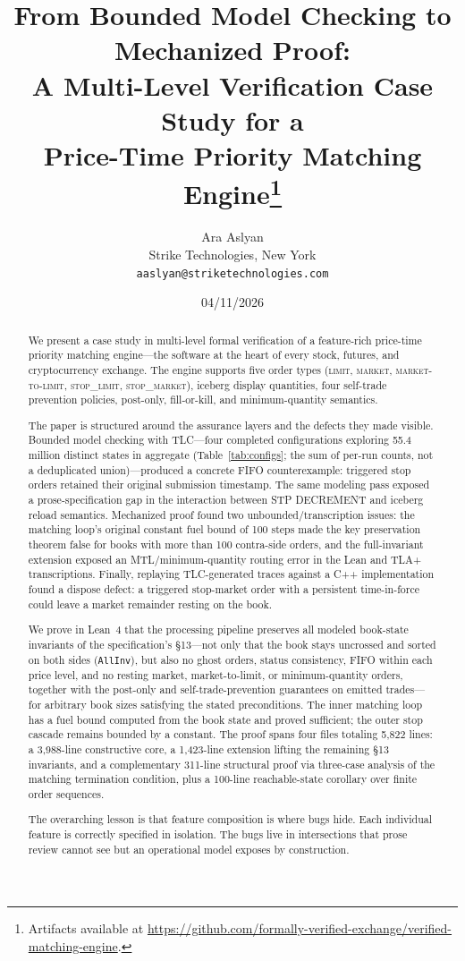 \documentclass[11pt,a4paper]{article}
\title{From Bounded Model Checking to Mechanized Proof:\\
A Multi-Level Verification Case Study for a\\
Price-Time Priority Matching Engine\thanks{Artifacts available at
\url{https://github.com/formally-verified-exchange/verified-matching-engine}.}}
\author{%
  Ara Aslyan\\
  Strike Technologies, New York\\
  \texttt{aaslyan@striketechnologies.com}
}
\date{04/11/2026}
\begin{document}
\maketitle

\begin{abstract}
We present a case study in multi-level formal verification of a
feature-rich price-time priority matching engine---the software at the
heart of every stock, futures, and cryptocurrency exchange. The engine
supports five order types (\textsc{limit}, \textsc{market},
\textsc{market-to-limit}, \textsc{stop\_limit}, \textsc{stop\_market}),
iceberg display quantities, four self-trade prevention policies,
post-only, fill-or-kill, and minimum-quantity semantics.

The paper is structured around the assurance layers and the defects they
made visible. Bounded model checking with TLC---four completed
configurations exploring 55.4 million distinct states in aggregate
(Table~\ref{tab:configs}; the sum of per-run counts, not a deduplicated
union)---produced a concrete FIFO counterexample: triggered stop orders
retained their original submission timestamp. The same modeling pass
exposed a prose-specification gap in the interaction between STP
DECREMENT and iceberg reload semantics.
Mechanized proof found two unbounded/transcription issues: the matching
loop's original constant fuel bound of 100 steps made the key
preservation theorem false for books with more than 100 contra-side
orders, and the full-invariant extension exposed an MTL/minimum-quantity
routing error in the Lean and TLA+ transcriptions. Finally, replaying
TLC-generated traces against a C++ implementation found a dispose defect:
a triggered stop-market order with a persistent time-in-force could
leave a market remainder resting on the book.

We prove in Lean~4 that the processing pipeline preserves all modeled
book-state invariants of the specification's \S13---not only that
the book stays uncrossed and sorted on both sides (\texttt{AllInv}), but
also no ghost orders, status consistency, FIFO within each price level,
and no resting market, market-to-limit, or minimum-quantity orders,
together with the post-only and self-trade-prevention guarantees on
emitted trades---for arbitrary book sizes satisfying the stated
preconditions. The inner matching loop has a fuel bound computed from
the book state and proved sufficient; the outer stop cascade remains
bounded by a constant. The proof spans four files totaling 5{,}822
lines: a 3{,}988-line constructive core, a
1{,}423-line extension lifting the remaining \S13 invariants, and a
complementary 311-line structural proof via three-case analysis of the
matching termination condition, plus a 100-line reachable-state
corollary over finite order sequences.

The overarching lesson is that feature composition is where bugs hide.
Each individual feature is correctly specified in isolation. The bugs
live in intersections that prose review cannot see but an operational
model exposes by construction.
\end{abstract}
\end{document}
